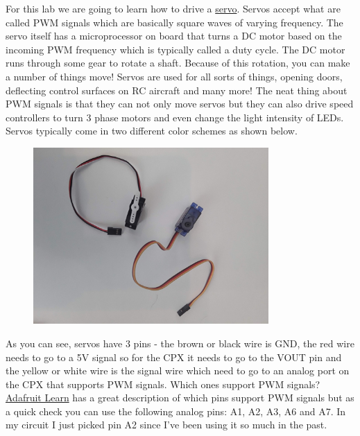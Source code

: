 For this lab we are going to learn how to drive a \href{https://www.adafruit.com/product/1143}{servo}. Servos accept what are called PWM signals which are basically square waves of varying frequency. The servo itself has a microprocessor on board that turns a DC motor based on the incoming PWM frequency which is typically called a duty cycle. The DC motor runs through some gear to rotate a shaft. Because of this rotation, you can make a number of things move! Servos are used for all sorts of things, opening doors, deflecting control surfaces on RC aircraft and many more! The neat thing about PWM signals is that they can not only move servos but they can also drive speed controllers to turn 3 phase motors and even change the light intensity of LEDs. Servos typically come in two different color schemes as shown below.
\begin{figure}[H]
  \begin{center}
    \includegraphics[width=0.8\textwidth]{Figures/servo.jpeg}
  \end{center}
\end{figure}
As you can see, servos have 3 pins - the brown or black wire is GND, the red wire needs to go to a 5V signal so for the CPX it needs to go to the VOUT pin and the yellow or white wire is the signal wire which need to go to an analog port on the CPX that supports PWM signals. Which ones support PWM signals? \href{https://learn.adafruit.com/adafruit-circuit-playground-express/pinouts}{Adafruit Learn} has a great description of which pins support PWM signals but as a quick check you can use the following analog pins: A1, A2, A3, A6 and A7. In my circuit I just picked pin A2 since I’ve been using it so much in the past.
